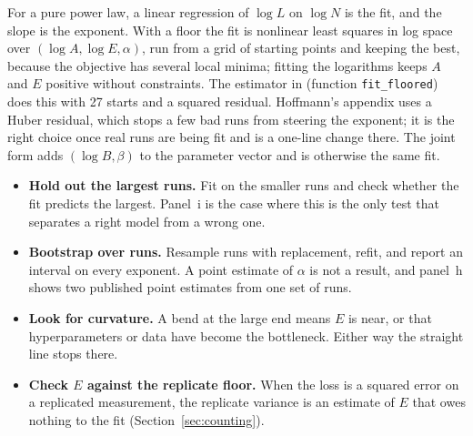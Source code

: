 For a pure power law, a linear regression of $\log L$ on $\log N$ is the fit, and
the slope is the exponent. With a floor the fit is nonlinear least squares in log
space over $(\log A, \log E, \alpha)$, run from a grid of starting points and
keeping the best, because the objective has several local minima; fitting the
logarithms keeps $A$ and $E$ positive without constraints. The estimator in
 (function
\texttt{fit\_floored}) does this with 27 starts and a squared residual. Hoffmann's
appendix uses a Huber residual, which stops a few bad runs from steering the
exponent; it is the right choice once real runs are being fit and is a one-line
change there. The joint form adds $(\log B, \beta)$ to the parameter vector and is
otherwise the same fit.

\begin{itemize}
\item \textbf{Hold out the largest runs.} Fit on the smaller runs and check whether
the fit predicts the largest. Panel~i is the case where this is the only test that
separates a right model from a wrong one.
\item \textbf{Bootstrap over runs.} Resample runs with replacement, refit, and
report an interval on every exponent. A point estimate of $\alpha$ is not a
result, and panel~h shows two published point estimates from one set of runs.
\item \textbf{Look for curvature.} A bend at the large end means $E$ is near, or
that hyperparameters or data have become the bottleneck. Either way the straight
line stops there.
\item \textbf{Check $E$ against the replicate floor.} When the loss is a squared
error on a replicated measurement, the replicate variance is an estimate of $E$
that owes nothing to the fit (Section~\ref{sec:counting}).
\end{itemize}
